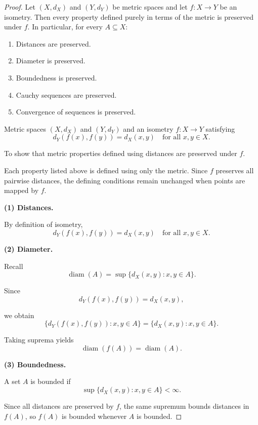 \begin{proof}

\Claim Let $(X,d_X)$ and $(Y,d_Y)$ be metric spaces and let
$f:X\to Y$ be an isometry. Then every property defined purely
in terms of the metric is preserved under $f$. In particular,
for every $A\subseteq X$:

\begin{enumerate}
\item Distances are preserved.
\item Diameter is preserved.
\item Boundedness is preserved.
\item Cauchy sequences are preserved.
\item Convergence of sequences is preserved.
\end{enumerate}

\Given Metric spaces $(X,d_X)$ and $(Y,d_Y)$ and an isometry
$f:X\to Y$ satisfying
\[
d_Y(f(x),f(y)) = d_X(x,y)
\quad
\text{for all } x,y\in X.
\]

\Goal To show that metric properties defined using distances
are preserved under $f$.

\Strategy Each property listed above is defined using only the
metric. Since $f$ preserves all pairwise distances, the defining
conditions remain unchanged when points are mapped by $f$.

\medskip

\textbf{(1) Distances.}

By definition of isometry,
\[
d_Y(f(x),f(y)) = d_X(x,y)
\quad
\text{for all } x,y\in X.
\]

\medskip

\textbf{(2) Diameter.}

Recall
\[
\operatorname{diam}(A)
=
\sup\{d_X(x,y):x,y\in A\}.
\]

Since
\[
d_Y(f(x),f(y)) = d_X(x,y),
\]

we obtain
\[
\{d_Y(f(x),f(y)):x,y\in A\}
=
\{d_X(x,y):x,y\in A\}.
\]

Taking suprema yields
\[
\operatorname{diam}(f(A))=\operatorname{diam}(A).
\]

\medskip

\textbf{(3) Boundedness.}

A set $A$ is bounded if
\[
\sup\{d_X(x,y):x,y\in A\}<\infty.
\]

Since all distances are preserved by $f$, the same supremum
bounds distances in $f(A)$, so $f(A)$ is bounded whenever $A$
is bounded.

\medskip


\end{proof}

